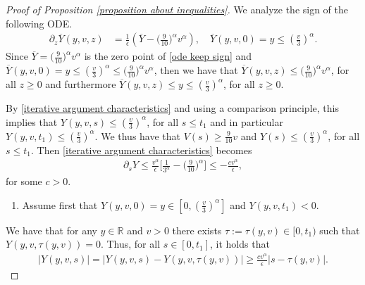 \documentclass[11pt]{article}
\numberwithin{equation}{section}
\begin{document}
\begin{proof}[Proof of Proposition \ref{proposition about inequalities}]
  We analyze the sign of the following ODE.
  \begin{align}\label{ode keep sign}
  \partial_{z}{\overline{Y}}(y,v,z)&= \frac{1}{\epsilon}(\overline{Y}-\Big(\frac{9}{10}\Big)^{\alpha}{v}^{\alpha}), \quad \overline{Y}(y,v,0)=y\leq (\frac{v}{3})^{\alpha}.
  \end{align}
  Since $\overline{Y}=\Big(\frac{9}{10}\Big)^{\alpha}{v}^{\alpha}$ is the zero point of \eqref{ode keep sign} and $\overline{Y}(y,v,0)=y\leq (\frac{v}{3})^{\alpha}\leq \Big(\frac{9}{10}\Big)^{\alpha}{v}^{\alpha}$, then we have that $\overline{Y}(y,v,z)\leq \Big(\frac{9}{10}\Big)^{\alpha}{v}^{\alpha}$, for all $z\geq 0$ and furthermore $\overline{Y}(y,v,z)\leq y\leq (\frac{v}{3})^{\alpha}$, for all $z\geq 0$.

  By \eqref{iterative argument characteristics} and using a comparison principle, this implies that $Y(y,v,s)\leq (\frac{v}{3})^{\alpha}$, for all $s\leq t_{1}$ and in particular $Y(y,v,t_{1})\leq (\frac{v}{3})^{\alpha}$.
We thus have that $V(s)\geq \frac{9}{10}v$ and $Y(s)\leq (\frac{v}{3})^{\alpha}$, for all $s\leq t_{1}$. Then \eqref{iterative argument characteristics} becomes
  \begin{align}\label{better inequality for Y}
      \partial_{s}Y\leq \frac{v^{\alpha}}{\epsilon}\bigg[\frac{1}{3^{\alpha}}-\Big(\frac{9}{10}\Big)^{\alpha}\bigg]\leq -\frac{c v^{\alpha}}{\epsilon},
  \end{align}
for some $c>0$.

\begin{enumerate}\item[i)] Assume first that $Y(y,v,0)=y\in[0,(\frac{v}{3})^{\alpha}]$ and  $Y(y,v,t_{1})<0$.
\end{enumerate} We have that for any $y\in\mathbb{R}$ and $v>0$ there exists $\tau:=\tau(y,v)\in[0,t_{1})$ such that $Y(y,v,\tau(y,v))=0$. Thus, for all $s\in[0,t_{1}]$, it holds that
\begin{align*}
 |Y(y,v,s)|=   |Y(y,v,s)-Y(y,v,\tau(y,v))|\geq \frac{c v^{\alpha}}{\epsilon}|s- \tau(y,v)|.
\end{align*}



\end{proof}
\end{document}
